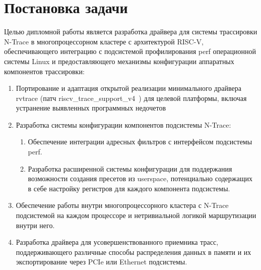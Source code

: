 
\section{Постановка задачи}
\label{sec:task}

Целью дипломной работы является разработка драйвера для системы трассировки N-Trace в многопроцессорном кластере
с архитектурой RISC-V, обеспечивающего интеграцию с подсистемой профилирования perf операционной системы Linux и предоставляющего
механизмы конфигурации аппаратных компонентов трассировки:
\begin{enumerate}
    \item Портирование и адаптация открытой реализации минимального драйвера rvtrace
    (патч riscv\_trace\_support\_v4~\cite{rvtrace_github}) для целевой платформы, включая
    устранение выявленных программных недочетов
    \item Разработка системы конфигурации компонентов подсистемы N-Trace:
    \begin{enumerate}
        \item Обеспечение интеграции адресных фильтров с интерфейсом подсистемы perf.
        \item Разработка расширенной системы конфигурации для поддержания возможности создания пресетов из userspace, потенциально
        содержащих в себе настройку регистров для каждого компонента подсистемы.
    \end{enumerate}
    \item Обеспечение работы внутри многопроцессорного кластера с N-Trace подсистемой на каждом процессоре и нетривиальной логикой
    маршрутизации внутри него.
    \item Разработка драйвера для усовершенствованного приемника трасс, поддерживающего различные способы распределения данных в памяти
    и их экспортирование через PCIe или Ethernet подсистемы.
\end{enumerate}
